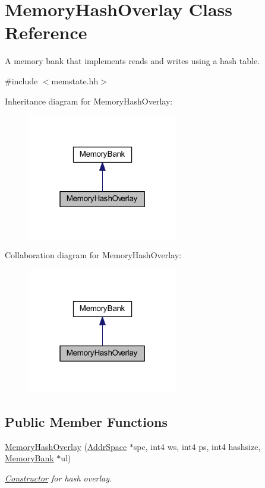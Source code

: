 \hypertarget{class_memory_hash_overlay}{}\section{Memory\+Hash\+Overlay Class Reference}
\label{class_memory_hash_overlay}


A memory bank that implements reads and writes using a hash table.  




{\ttfamily \#include $<$memstate.\+hh$>$}



Inheritance diagram for Memory\+Hash\+Overlay\+:
\nopagebreak
\begin{figure}[H]
\begin{center}
\leavevmode
\includegraphics[width=187pt]{class_memory_hash_overlay__inherit__graph}
\end{center}
\end{figure}


Collaboration diagram for Memory\+Hash\+Overlay\+:
\nopagebreak
\begin{figure}[H]
\begin{center}
\leavevmode
\includegraphics[width=187pt]{class_memory_hash_overlay__coll__graph}
\end{center}
\end{figure}
\subsection*{Public Member Functions}
\begin{DoxyCompactItemize}
\item 
\mbox{\hyperlink{class_memory_hash_overlay_aa5e7123b11ee1ea2ef27ffc43210a803}{Memory\+Hash\+Overlay}} (\mbox{\hyperlink{class_addr_space}{Addr\+Space}} $\ast$spc, int4 ws, int4 ps, int4 hashsize, \mbox{\hyperlink{class_memory_bank}{Memory\+Bank}} $\ast$ul)
\begin{DoxyCompactList}\small\item\em \mbox{\hyperlink{class_constructor}{Constructor}} for hash overlay. \end{DoxyCompactList}\end{DoxyCompactItemize}
